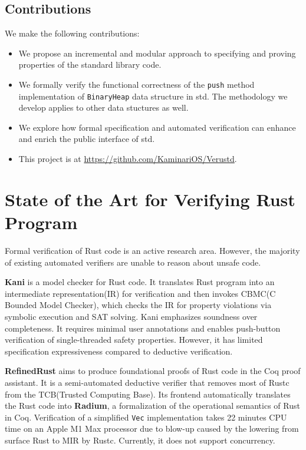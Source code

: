 \documentclass[conference]{IEEEtran}
\begin{document}
\subsection{Contributions}
We make the following contributions:
\begin{itemize}
        \item We propose an incremental and modular approach to specifying and proving properties of the standard library code.
        \item We formally verify the functional correctness of the \texttt{push} method implementation of \texttt{BinaryHeap} data structure in std. The methodology we develop applies to other data stuctures as well.
        \item We explore how formal specification and automated verification can enhance and enrich the public interface of std. 
        \item This project is at \href{https://github.com/KaminariOS/Verustd}{https://github.com/KaminariOS/Verustd}.
\end{itemize}
        
\section{State of the Art for Verifying Rust Program}
Formal verification of Rust code is an active research area. However, the majority of existing automated verifiers\cite{Prusti,Creusot} are unable to reason about unsafe code. 

\textbf{Kani}\cite{kani} is a model checker for Rust code. It translates Rust program into an intermediate representation(IR) for verification and then invokes CBMC(C Bounded Model Checker)\cite{kroening2023cbmccboundedmodel}, which checks the IR for property violations via symbolic execution and SAT solving. Kani emphasizes soundness over completeness. It requires minimal user annotations and enables push-button verification of single-threaded safety properties. However, it has limited specification expressiveness compared to deductive verification.   

\textbf{RefinedRust}\cite{RefinedRust} aims to produce foundational proofs of Rust code in the Coq proof assistant. It is a semi-automated deductive verifier that removes most of Rustc from the TCB(Trusted Computing Base). Its frontend automatically translates the Rust code into \textbf{Radium}, a formalization of the operational semantics of Rust in Coq. Verification of a simplified \texttt{Vec} implementation takes 22 minutes CPU time on an Apple M1 Max processor due to blow-up caused by the lowering from surface Rust to MIR by Rustc. Currently, it does not support concurrency.    
\end{document}
